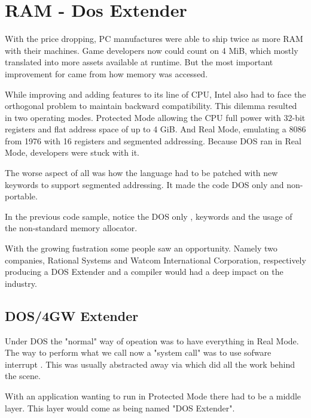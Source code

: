 \section{RAM - Dos Extender}
With the price dropping, PC manufactures were able to ship twice as more RAM with their machines. Game developers now could count on 4 MiB, which mostly translated into more assets available at runtime. But the most important improvement for \doom came from how memory was accessed.\\
\par
While improving and adding features to its line of CPU, Intel also had to face the orthogonal problem to maintain backward compatibility. This dilemma resulted in two operating modes. Protected Mode allowing the CPU full power with 32-bit registers and flat address space of up to 4 GiB. And Real Mode, emulating a 8086 from 1976 with 16 registers and segmented addressing. Because DOS ran in Real Mode, developers were stuck with it.\\
\par
The worse aspect of all was how the language had to be patched with new keywords to support segmented addressing. It made the code DOS only and non-portable.\\
\par
{}
\par
In the previous code sample, notice the DOS only ,  keywords and the usage of the non-standard  memory allocator.\\
\par
With the growing fustration some people saw an opportunity. Namely two companies, Rational Systems and Watcom International Corporation, respectively producing a DOS Extender and a compiler would had a deep impact on the industry.\\
\par
\pagebreak

\subsection{DOS/4GW Extender}
Under DOS the "normal" way of opeation was to have everything in Real Mode. The way to perform what we call now a "system call" was to use sofware interrupt . This was usually abstracted away via  which did all the work behind the scene.\\
\par
{}
With an application wanting to run in Protected Mode there had to be a middle layer. This layer would come as being named "DOS Extender".\\

